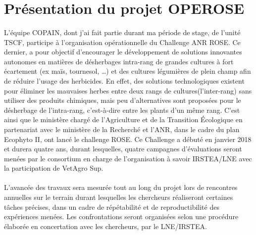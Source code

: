 \section{Présentation du projet \gls{OPEROSE}}
\paragraph{}
L’équipe COPAIN, dont j’ai fait partie durant ma période de stage, de l’unité TSCF, participe à l’organisation opérationnelle du Challenge \gls{ANR} \gls{ROSE}. Ce dernier, a pour objectif d’encourager le développement de solutions innovantes autonomes en matières de désherbages intra-rang de grandes cultures à fort écartement (ex maïs, tournesol, …) et des cultures légumières de plein champ afin de réduire l’usage des herbicides. En effet, des solutions technologiques existent pour éliminer les mauvaises herbes entre deux rangs de cultures(l’inter-rang) sans utiliser des produits chimiques, mais peu d’alternatives sont proposées pour le désherbage de l’intra-rang, c’est-à-dire entre les plants d’un même rang. C’est ainsi que le ministère chargé de l’Agriculture et de la Transition Écologique en partenariat avec le ministère de la Recherché et l’ANR, dans le cadre du plan Ecophyto II, ont lancé le challenge ROSE.  Ce Challenge a débuté en janvier 2018 et durera quatre ans, durant lesquelles, quatre campagnes d’évaluations seront menées par le consortium en charge de l’organisation à savoir IRSTEA/LNE avec la participation de VetAgro Sup.  
\paragraph{}
L’avancée des travaux sera mesurée tout au long du projet lors de rencontres annuelles sur le terrain durant lesquelles les chercheurs réaliseront certaines tâches précises, dans un cadre de répétabilité et de reproductibilité des expériences menées. Les confrontations seront organisées selon une procédure élaborée en concertation avec les chercheurs, par le LNE/IRSTEA. 

